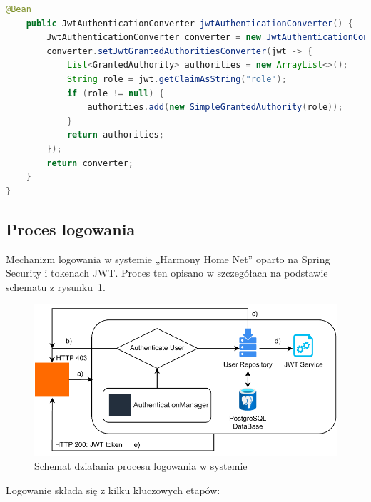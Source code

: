 \begin{lstlisting}[language=Java, style=JavaStyle, caption=Pełna konfiguracja łańcucha filtrów bezpieczeństwa]
    @Bean
    public JwtAuthenticationConverter jwtAuthenticationConverter() {
        JwtAuthenticationConverter converter = new JwtAuthenticationConverter();
        converter.setJwtGrantedAuthoritiesConverter(jwt -> {
            List<GrantedAuthority> authorities = new ArrayList<>();
            String role = jwt.getClaimAsString("role");
            if (role != null) {
                authorities.add(new SimpleGrantedAuthority(role));
            }
            return authorities;
        });
        return converter;
    }
}
\end{lstlisting}

\subsection{Proces logowania}

Mechanizm logowania w systemie „Harmony Home Net” oparto na Spring Security i tokenach JWT. Proces ten opisano w szczegółach na podstawie schematu z rysunku~\ref{fig:ebok_db_concept}.

\begin{figure}[ht]
    \centering
    \includegraphics[scale=1.0]{rys03/proces_logowania}
    \caption{Schemat działania procesu logowania w systemie~\cite{JWToauth}}
    \label{fig:ebok_db_concept}
\end{figure}

Logowanie składa się z kilku kluczowych etapów:

